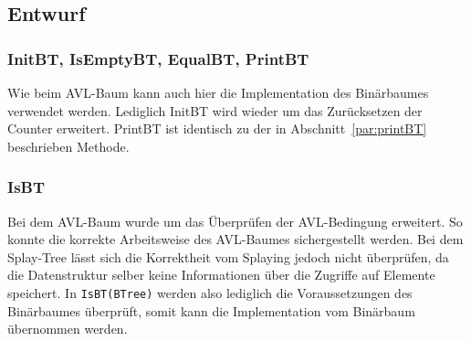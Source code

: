 \subsection{Entwurf}\label{subsec:splay-entwurf}

\subsubsection{InitBT, IsEmptyBT, EqualBT, PrintBT}
Wie beim AVL-Baum kann auch hier die Implementation des Binärbaumes verwendet werden.
Lediglich InitBT wird wieder um das Zurücksetzen der Counter erweitert.
PrintBT ist identisch zu der in Abschnitt~\ref{par:printBT} beschrieben Methode.

\subsubsection{IsBT}
Bei dem AVL-Baum wurde  um das Überprüfen der AVL-Bedingung erweitert.
So konnte die korrekte Arbeitsweise des AVL-Baumes sichergestellt werden.
Bei dem Splay-Tree lässt sich die Korrektheit vom Splaying jedoch nicht überprüfen, da die
Datenstruktur selber keine Informationen über die Zugriffe auf Elemente speichert.
In \verb|IsBT(BTree)| werden also lediglich die Voraussetzungen des Binärbaumes überprüft,
somit kann die Implementation vom Binärbaum übernommen werden.

